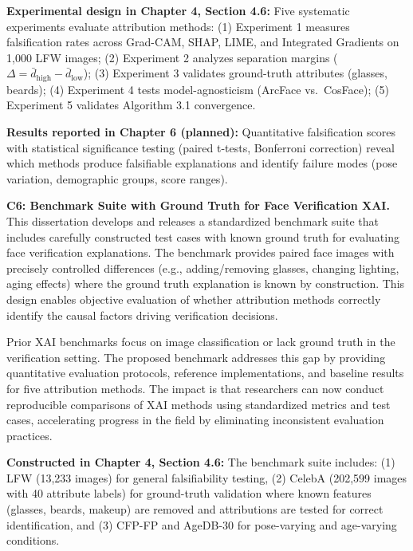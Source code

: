 \vspace{0.3cm}
\noindent\textbf{Experimental design in Chapter 4, Section 4.6:} Five systematic experiments evaluate attribution methods: (1) Experiment 1 measures falsification rates across Grad-CAM, SHAP, LIME, and Integrated Gradients on 1,000 LFW images; (2) Experiment 2 analyzes separation margins ($\Delta = \bar{d}_{\text{high}} - \bar{d}_{\text{low}}$); (3) Experiment 3 validates ground-truth attributes (glasses, beards); (4) Experiment 4 tests model-agnosticism (ArcFace vs.\ CosFace); (5) Experiment 5 validates Algorithm 3.1 convergence.

\vspace{0.3cm}
\noindent\textbf{Results reported in Chapter 6 (planned):} Quantitative falsification scores with statistical significance testing (paired t-tests, Bonferroni correction) reveal which methods produce falsifiable explanations and identify failure modes (pose variation, demographic groups, score ranges).

\vspace{0.5cm}

\textbf{C6: Benchmark Suite with Ground Truth for Face Verification XAI.} This dissertation develops and releases a standardized benchmark suite that includes carefully constructed test cases with known ground truth for evaluating face verification explanations. The benchmark provides paired face images with precisely controlled differences (e.g., adding/removing glasses, changing lighting, aging effects) where the ground truth explanation is known by construction. This design enables objective evaluation of whether attribution methods correctly identify the causal factors driving verification decisions.

Prior XAI benchmarks focus on image classification \cite{hooker2019benchmark} or lack ground truth in the verification setting. The proposed benchmark addresses this gap by providing quantitative evaluation protocols, reference implementations, and baseline results for five attribution methods. The impact is that researchers can now conduct reproducible comparisons of XAI methods using standardized metrics and test cases, accelerating progress in the field by eliminating inconsistent evaluation practices.

\vspace{0.3cm}
\noindent\textbf{Constructed in Chapter 4, Section 4.6:} The benchmark suite includes: (1) LFW (13,233 images) for general falsifiability testing, (2) CelebA (202,599 images with 40 attribute labels) for ground-truth validation where known features (glasses, beards, makeup) are removed and attributions are tested for correct identification, and (3) CFP-FP and AgeDB-30 for pose-varying and age-varying conditions.

